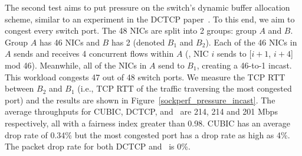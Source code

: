 {\crs The second test aims to put pressure on the switch's dynamic 
buffer allocation scheme, similar to an experiment in the DCTCP paper~\cite{alizadeh2011data}.} To this end, we aim to congest every switch port.
The 48 NICs are split into 2 groups: group $A$ and $B$. 
Group $A$ has 46 NICs and $B$ has 2 (denoted $B_1$ and $B_2$). 
Each of the 46 NICs in $A$ sends and receives 4 concurrent flows within $A$ 
(\ie{}, NIC $i$ sends to [$i+1$, $i+4$] mod 46). 
Meanwhile, all of the NICs in $A$ send to $B_1$, creating a 46-to-1 incast. 
This workload congests 47 out of 48 switch ports. 
We measure the TCP RTT between $B_2$ and $B_1$ (i.e., TCP RTT of the traffic traversing the most congested port) and 
the results are shown in Figure~\ref{sockperf_pressure_incast}. 
The average throughputs for CUBIC, DCTCP, and~\acdc{} are 214, 214 and 201 Mbps respectively, 
all with a fairness index greater than 0.98. 
CUBIC has an average drop rate of 0.34\% but the most congested port has a drop rate as high as 4\%. 
The packet drop rate for both DCTCP and~\acdc{} is 0\%.



